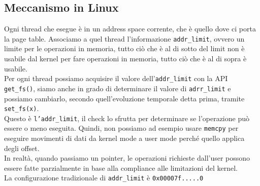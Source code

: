 \documentclass[12pt, oneside]{extbook}
\begin{document}
\subsection{Meccanismo in Linux}
Ogni thread che esegue è in un address space corrente, che è quello dove ci porta la page table. Associamo a quel thread l'informazione \texttt{addr\_limit}, ovvero un limite per le operazioni in memoria, tutto ciò che è al di sotto del limit non è usabile dal kernel per fare operazioni in memoria, tutto ciò che è al di sopra è usabile.\\Per ogni thread possiamo acquisire il valore dell'\texttt{addr\_limit} con la API \texttt{get\_fs()}, siamo anche in grado di determinare il valore di \texttt{adrr\_limit} e possiamo cambiarlo, secondo quell'evoluzione temporale detta prima, tramite \texttt{set\_fs(x)}.\\Questo è \texttt{l'addr\_limit}, il check lo sfrutta per determinare se l'operazione può essere o meno eseguita. Quindi, non possiamo ad esempio usare \texttt{memcpy} per eseguire movimenti di dati da kernel mode a user mode perché quello applica degli offset.\\In realtà, quando passiamo un pointer, le operazioni richieste dall'user possono essere fatte parzialmente in base alla compliance alle limitazioni del kernel.\\La configurazione tradizionale di \texttt{addr\_limit} è \texttt{0x00007f.....0}
\end{document}
